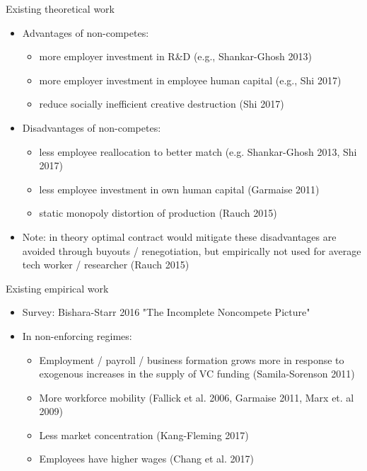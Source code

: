 \documentclass[english,usenames,dvipsnames]{beamer}
\begin{document}
\begin{frame}{Existing theoretical work}
\begin{itemize}
\item Advantages of non-competes:
\begin{itemize}
	\item more employer investment in R\&D (e.g., Shankar-Ghosh 2013)
	\item more employer investment in employee human capital (e.g., Shi 2017)
	\item reduce socially inefficient creative destruction (Shi 2017)
\end{itemize}
\item Disadvantages of non-competes:
\begin{itemize}
	\item less employee reallocation to better match (e.g. Shankar-Ghosh 2013, Shi 2017)
	\item less employee investment in own human capital (Garmaise 2011) 
	\item static monopoly distortion of production (Rauch 2015)
\end{itemize}
\item Note: in theory optimal contract would mitigate these disadvantages are avoided through buyouts / renegotiation, but empirically not used for average tech worker / researcher (Rauch 2015)
\end{itemize}
\end{frame}

\begin{frame}{Existing empirical work}
\label{empirical_work1}
\begin{itemize}
	\item Survey: Bishara-Starr 2016 "The Incomplete Noncompete Picture"
	\item In non-enforcing regimes:
	\begin{itemize}
		\item Employment / payroll / business formation grows more in response to exogenous increases in the supply of VC funding (Samila-Sorenson 2011)
		\item More workforce mobility (Fallick et al. 2006, Garmaise 2011, Marx et. al 2009)
		\item Less market concentration (Kang-Fleming 2017)
		\item Employees have higher wages (Chang et al. 2017)
	\end{itemize}
\end{itemize}
\end{frame}
\end{document}
